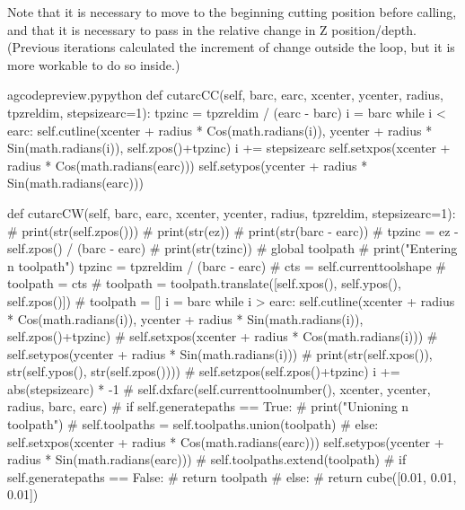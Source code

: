 \documentclass{ltxdoc}
\begin{document}

Note that it is necessary to move to the beginning cutting position before calling, and that it is necessary to pass in the relative change in Z position/depth. (Previous iterations calculated the increment of change outside the loop, but it is more workable to do so inside.)

\lstset{firstnumber=\thegcpy}
\begin{writecode}{a}{gcodepreview.py}{python}
    def cutarcCC(self, barc, earc, xcenter, ycenter, radius, tpzreldim, stepsizearc=1):
        tpzinc = tpzreldim / (earc - barc)
        i = barc
        while i < earc: 
            self.cutline(xcenter + radius * Cos(math.radians(i)), ycenter + radius * Sin(math.radians(i)), self.zpos()+tpzinc)
            i += stepsizearc
        self.setxpos(xcenter + radius * Cos(math.radians(earc)))
        self.setypos(ycenter + radius * Sin(math.radians(earc)))

    def cutarcCW(self, barc, earc, xcenter, ycenter, radius, tpzreldim, stepsizearc=1):
#        print(str(self.zpos()))
#        print(str(ez))
#        print(str(barc - earc))
#        tpzinc = ez - self.zpos() / (barc - earc)
#        print(str(tzinc))
#        global toolpath
#        print("Entering n toolpath")
        tpzinc = tpzreldim / (barc - earc)
#        cts = self.currenttoolshape
#        toolpath = cts
#        toolpath = toolpath.translate([self.xpos(), self.ypos(), self.zpos()])
#        toolpath = []
        i = barc
        while i > earc: 
            self.cutline(xcenter + radius * Cos(math.radians(i)), ycenter + radius * Sin(math.radians(i)), self.zpos()+tpzinc)
#            self.setxpos(xcenter + radius * Cos(math.radians(i)))
#            self.setypos(ycenter + radius * Sin(math.radians(i)))
#            print(str(self.xpos()), str(self.ypos(), str(self.zpos())))
#            self.setzpos(self.zpos()+tpzinc)
            i += abs(stepsizearc) * -1
#        self.dxfarc(self.currenttoolnumber(), xcenter, ycenter, radius, barc, earc)
#        if self.generatepaths == True:
#            print("Unioning n toolpath")
#            self.toolpaths = self.toolpaths.union(toolpath)
#        else:
        self.setxpos(xcenter + radius * Cos(math.radians(earc)))
        self.setypos(ycenter + radius * Sin(math.radians(earc)))
#        self.toolpaths.extend(toolpath)
#        if self.generatepaths == False:
#        return toolpath
#        else:
#            return cube([0.01, 0.01, 0.01])

\end{writecode}
\addtocounter{gcpy}{43}
\end{document}
